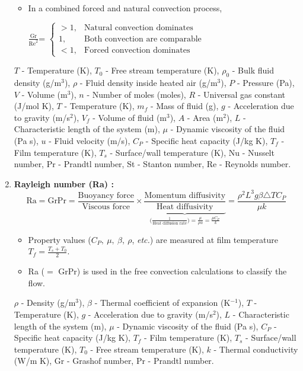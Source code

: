 \documentclass[a4paper, 12 pt]{article}
\begin{document}
\begin{enumerate}
\begin{itemize}
        \item In a combined forced and natural convection process, 
        \begin{center}
        $\frac{\text{Gr}}{\text{Re}^2}$=
        $ 
            \begin{cases} 
            >1, &\text{Natural convection dominates}\\
            1, &\text{Both convection are comparable}\\
            <1, &\text{Forced convection dominates}
            \end{cases}
        $
        \end{center}
        
    \end{itemize}       
    $T$ - Temperature (K), 
    $T_0$ - Free stream temperature (K),
    $\rho _0$ - Bulk fluid density (g/m$^3$),
    $\rho$ - Fluid density inside heated air (g/m$^3$),
    $P$ - Pressure (Pa),
    $V$ - Volume (m$^3$),
    $n$ - Number of moles (moles), 
    $R$ - Universal gas constant (J/mol K),
    $T$ - Temperature (K),
    $m_f$ - Mass of fluid (g),
    $g$ - Acceleration due to gravity (m/s$^2$),
    $V_f$ - Volume of fluid (m$^3$),
    $A$ - Area (m$^2$),
    $L$ - Characteristic length of the system (m),
    $\mu$ - Dynamic viscosity of the fluid (Pa s),
    $u$ - Fluid velocity (m/s),
    $C_P$ - Specific heat capacity (J/kg K),
    $T_f$ - Film temperature (K),
    $T_s$ - Surface/wall temperature (K),
    Nu - Nusselt number,
    Pr - Prandtl number,
    St - Stanton number,
    Re - Reynolds number.
    
    \item \textbf{Rayleigh number (Ra) : }
    $$\text{Ra}=\text{GrPr}=\frac{\text{Buoyancy force}}{\text{Viscous force}} \times \underbrace{\frac{\text{Momentum diffusivity}}{\text{Heat diffusivity}}}_{\big( \frac{1}{\text{Heat diffusion rate}} \big) = \frac{\mu}{\rho\alpha}=\frac{\mu C_P}{k}} = \frac{\rho^2L^3g\beta \triangle T C_P}{\mu k} $$
    \begin{itemize}
        \item Property values ($C_P,\ \mu,\ \beta, \ \rho$, \textit{etc.}) are measured at film temperature $T_f=\frac{T_s+T_0}{2}$.
        
        \item Ra ($=$ GrPr) is used in the free convection calculations to classify the flow. 
        
    \end{itemize}
    $\rho$ - Density (g/m$^3$),
    $\beta$ - Thermal coefficient of expansion (K$^{-1}$),
    $T$ - Temperature (K),
    $g$ - Acceleration due to gravity (m/s$^2$),
    $L$ - Characteristic length of the system (m),
    $\mu$ - Dynamic viscosity of the fluid (Pa s),
    $C_P$ - Specific heat capacity (J/kg K),
    $T_f$ - Film temperature (K),
    $T_s$ - Surface/wall temperature (K),
    $T_0$ - Free stream temperature (K),
    $k$ - Thermal conductivity (W/m K),
    Gr - Grashof number,
    Pr - Prandtl number.
    

\end{enumerate}
\end{document}
